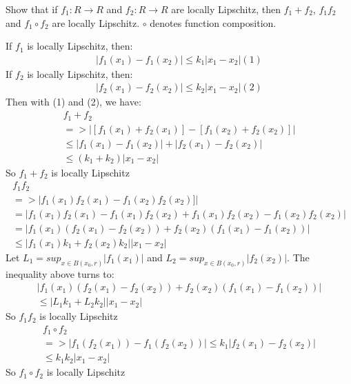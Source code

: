 \begin{problem}[15]
    Show that if $f_1: R \rightarrow R$ and $f_2: R \rightarrow R$ are locally Lipschitz, then $f_1+f_2$, $f_1f_2$ and $f_1 \circ f_2$ are locally Lipschitz. $\circ$ denotes function composition.
\end{problem}

\begin{answer}
    If  $f_1$ is locally Lipschitz, then:
    \begin{align*}
        |f_1(x_1)-f_1(x_2)|\leq k_1|x_1-x_2| (1)
    \end{align*}
    If  $f_2$ is locally Lipschitz, then:
    \begin{align*}
        |f_2(x_1)-f_2(x_2)|\leq k_2|x_1-x_2|(2)
    \end{align*}
    Then with (1) and (2), we have:
    \begin{align*}
    		f_1+f_2\\
        =>|[f_1(x_1)+f_2(x_1)]-[f_1(x_2)+f_2(x_2)]| \\
        \leq|f_1(x_1)-f_1(x_2)|+|f_2(x_1)-f_2(x_2)|\\
        \leq (k_1+k_2)|x_1-x_2|
    \end{align*}
    So $f_1+f_2$ is locally Lipschitz
    \begin{align*}
    		f_1f_2\\
        =>|f_1(x_1)f_2(x_1)-f_1(x_2)f_2(x_2)]| \\
        = |f_1(x_1)f_2(x_1)-f_1(x_1)f_2(x_2)+f_1(x_1)f_2(x_2)-f_1(x_2)f_2(x_2) |\\
        =|f_1(x_1)(f_2(x_1)-f_2(x_2))+f_2(x_2)(f_1(x_1)-f_1(x_2))|\\ 
        \leq |f_1(x_1)k_1+f_2(x_2)k_2||x_1-x_2|
    \end{align*}
    Let $L_1=sup_{x \in B(x_0,r)}|f_1(x_1)| $ and $L_2=sup_{x \in B(x_0,r)}|f_2(x_2)| $. The inequality above turns to:
    \begin{align*}
    		|f_1(x_1)(f_2(x_1)-f_2(x_2))+f_2(x_2)(f_1(x_1)-f_1(x_2))|\\ 
        \leq |L_1k_1+L_2k_2||x_1-x_2|
    \end{align*}
    So $f_1f_2$ is locally Lipschitz
    \begin{align*}
    f_1 \circ f_2\\
    => |f_1(f_2(x_1)) - f_1(f_2(x_2))| \leq k_1|f_2(x_1)-f_2(x_2)|\\
    \leq k_1k_2|x_1-x_2|
    \end{align*}
    So $f_1 \circ f_2$ is locally Lipschitz
\end{answer}

